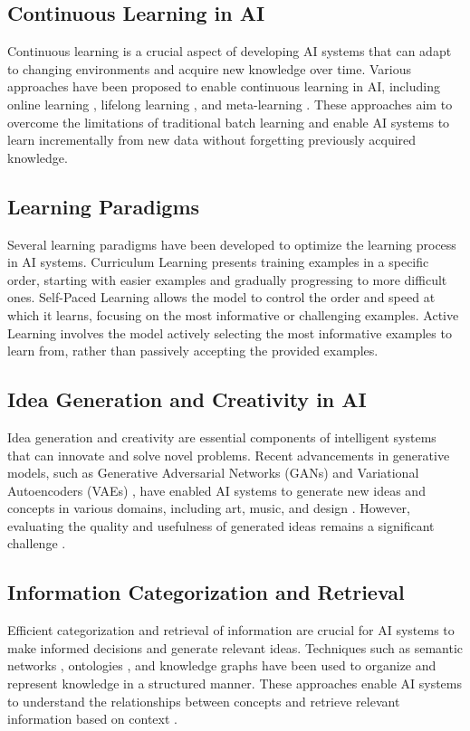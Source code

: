 \documentclass[conference]{article}
\begin{document}
	\subsection{Continuous Learning in AI}
	Continuous learning is a crucial aspect of developing AI systems that can adapt to changing environments and acquire new knowledge over time. Various approaches have been proposed to enable continuous learning in AI, including online learning \cite{hoi2018online}, lifelong learning \cite{parisi2019continual}, and meta-learning \cite{finn2017model}. These approaches aim to overcome the limitations of traditional batch learning and enable AI systems to learn incrementally from new data without forgetting previously acquired knowledge.
	
	\subsection{Learning Paradigms}
	Several learning paradigms have been developed to optimize the learning process in AI systems. Curriculum Learning \cite{bengio2009curriculum} presents training examples in a specific order, starting with easier examples and gradually progressing to more difficult ones. Self-Paced Learning \cite{kumar2010self} allows the model to control the order and speed at which it learns, focusing on the most informative or challenging examples. Active Learning \cite{settles2009active} involves the model actively selecting the most informative examples to learn from, rather than passively accepting the provided examples.
	
	\subsection{Idea Generation and Creativity in AI}
	Idea generation and creativity are essential components of intelligent systems that can innovate and solve novel problems. Recent advancements in generative models, such as Generative Adversarial Networks (GANs) \cite{goodfellow2014generative} and Variational Autoencoders (VAEs) \cite{kingma2014auto}, have enabled AI systems to generate new ideas and concepts in various domains, including art, music, and design \cite{ramesh2021zero}. However, evaluating the quality and usefulness of generated ideas remains a significant challenge \cite{boden2004creative}.
	
	\subsection{Information Categorization and Retrieval}
	Efficient categorization and retrieval of information are crucial for AI systems to make informed decisions and generate relevant ideas. Techniques such as semantic networks \cite{sowa2006semantic}, ontologies \cite{gruber1993translation}, and knowledge graphs \cite{ji2021survey} have been used to organize and represent knowledge in a structured manner. These approaches enable AI systems to understand the relationships between concepts and retrieve relevant information based on context \cite{bordes2013translating}.
	
\end{document}
